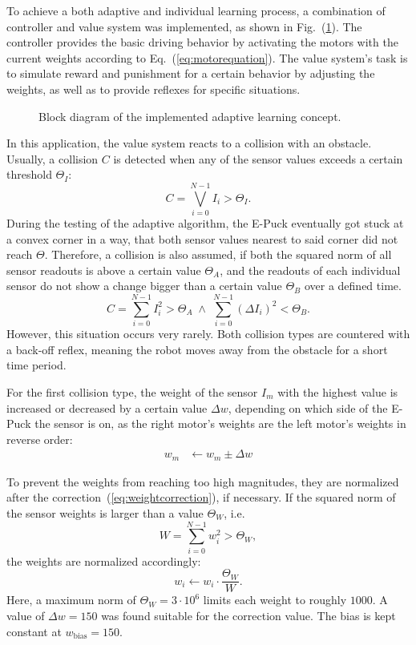 \documentclass[a4paper]{jacow}
\begin{document}
To achieve a both adaptive and individual learning process, a combination of controller and value system was implemented, as shown in Fig.~(\ref{fig:adaptivelearningsketch}). The controller provides the basic driving behavior by activating the motors with the current weights according to Eq.~(\ref{eq:motorequation}).
The value system's task is to simulate reward and punishment for a certain behavior by adjusting the weights, as well as to provide reflexes for specific situations.

\begin{figure}[tbp]
	\centering
	
	\caption{Block diagram of the implemented adaptive learning concept.}
	\label{fig:adaptivelearningsketch}
\end{figure}

In this application, the value system reacts to a collision with an obstacle. Usually, a collision $C$ is detected when any of the sensor values exceeds a certain threshold $\Theta_I$:
\begin{equation}
	C = \bigvee\limits_{i=0}^{N-1} I_i > \Theta_I. 
\end{equation}
During the testing of the adaptive algorithm, the E-Puck eventually got stuck at a convex corner in a way, that both sensor values nearest to said corner did not reach $\Theta$. Therefore, a collision is also assumed, if both the squared norm of all sensor readouts is above a certain value $\Theta_A$, and the readouts of each individual sensor do not show a change bigger than a certain value $\Theta_B$ over a defined time.
\begin{equation}
	C = \sum\limits_{i=0}^{N-1} I_i^2 > \Theta_A \;\wedge\; \sum\limits_{i=0}^{N-1} (\Delta I_i)^2 < \Theta_B.
\end{equation}
However, this situation occurs very rarely. 
Both collision types are countered with a back-off reflex, meaning the robot moves away from the obstacle for a short time period.

For the first collision type, the weight of the sensor $I_m$ with the highest value is increased or decreased by a certain value $\Delta w$, depending on which side of the E-Puck the sensor is on, as the right motor's weights are the left motor's weights in reverse order:
\begin{align}
	w_m &\leftarrow w_m \pm \Delta w\label{eq:weightcorrection}
\end{align}

To prevent the weights from reaching too high magnitudes, they are normalized after the correction~(\ref{eq:weightcorrection}), if necessary. If the squared norm of the sensor weights is larger than a value $\Theta_W$, i.e.
\begin{equation}
	W = \sum\limits_{i=0}^{N-1} w_i^2 > \Theta_W,
\end{equation}
the weights are normalized accordingly:
\begin{equation}
	w_i \leftarrow w_i \cdot \frac{\Theta_W}{W}.
\end{equation}
Here, a maximum norm of $\Theta_W=3\cdot 10^6$ limits each weight to roughly $1000$. A value of $\Delta w = 150$ was found suitable for the correction value. The bias is kept constant at $w_\text{bias} = 150$.
\end{document}
